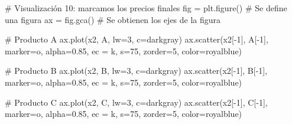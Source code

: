 \documentclass[
  letterpaper,
  DIV=11,
  numbers=noendperiod]{scrreprt}
\newenvironment{Shaded}{\begin{snugshade}}{\end{snugshade}}
\newcommand{\CommentTok}[1]{\textcolor[rgb]{0.37,0.37,0.37}{#1}}
\newcommand{\DecValTok}[1]{\textcolor[rgb]{0.68,0.00,0.00}{#1}}
\newcommand{\FloatTok}[1]{\textcolor[rgb]{0.68,0.00,0.00}{#1}}
\newcommand{\NormalTok}[1]{\textcolor[rgb]{0.00,0.23,0.31}{#1}}
\newcommand{\OperatorTok}[1]{\textcolor[rgb]{0.37,0.37,0.37}{#1}}
\newcommand{\StringTok}[1]{\textcolor[rgb]{0.13,0.47,0.30}{#1}}
\begin{document}
\begin{Shaded}
\begin{Highlighting}[]
\CommentTok{\# Visualización 10: marcamos los precios finales}
\NormalTok{fig }\OperatorTok{=}\NormalTok{ plt.figure() }\CommentTok{\# Se define una figura}
\NormalTok{ax }\OperatorTok{=}\NormalTok{ fig.gca()     }\CommentTok{\# Se obtienen los ejes de la figura}

\CommentTok{\# Producto A}
\NormalTok{ax.plot(x2, A, lw}\OperatorTok{=}\DecValTok{3}\NormalTok{, c}\OperatorTok{=}\StringTok{\textquotesingle{}darkgray\textquotesingle{}}\NormalTok{)}
\NormalTok{ax.scatter(x2[}\OperatorTok{{-}}\DecValTok{1}\NormalTok{], A[}\OperatorTok{{-}}\DecValTok{1}\NormalTok{], marker}\OperatorTok{=}\StringTok{\textquotesingle{}o\textquotesingle{}}\NormalTok{, alpha}\OperatorTok{=}\FloatTok{0.85}\NormalTok{, ec }\OperatorTok{=} \StringTok{\textquotesingle{}k\textquotesingle{}}\NormalTok{, s}\OperatorTok{=}\DecValTok{75}\NormalTok{, zorder}\OperatorTok{=}\DecValTok{5}\NormalTok{, color}\OperatorTok{=}\StringTok{\textquotesingle{}royalblue\textquotesingle{}}\NormalTok{)}

\CommentTok{\# Producto B}
\NormalTok{ax.plot(x2, B, lw}\OperatorTok{=}\DecValTok{3}\NormalTok{, c}\OperatorTok{=}\StringTok{\textquotesingle{}darkgray\textquotesingle{}}\NormalTok{)}
\NormalTok{ax.scatter(x2[}\OperatorTok{{-}}\DecValTok{1}\NormalTok{], B[}\OperatorTok{{-}}\DecValTok{1}\NormalTok{], marker}\OperatorTok{=}\StringTok{\textquotesingle{}o\textquotesingle{}}\NormalTok{, alpha}\OperatorTok{=}\FloatTok{0.85}\NormalTok{, ec }\OperatorTok{=} \StringTok{\textquotesingle{}k\textquotesingle{}}\NormalTok{, s}\OperatorTok{=}\DecValTok{75}\NormalTok{, zorder}\OperatorTok{=}\DecValTok{5}\NormalTok{, color}\OperatorTok{=}\StringTok{\textquotesingle{}royalblue\textquotesingle{}}\NormalTok{)}

\CommentTok{\# Producto C}
\NormalTok{ax.plot(x2, C, lw}\OperatorTok{=}\DecValTok{3}\NormalTok{, c}\OperatorTok{=}\StringTok{\textquotesingle{}darkgray\textquotesingle{}}\NormalTok{)}
\NormalTok{ax.scatter(x2[}\OperatorTok{{-}}\DecValTok{1}\NormalTok{], C[}\OperatorTok{{-}}\DecValTok{1}\NormalTok{], marker}\OperatorTok{=}\StringTok{\textquotesingle{}o\textquotesingle{}}\NormalTok{, alpha}\OperatorTok{=}\FloatTok{0.85}\NormalTok{, ec }\OperatorTok{=} \StringTok{\textquotesingle{}k\textquotesingle{}}\NormalTok{, s}\OperatorTok{=}\DecValTok{75}\NormalTok{, zorder}\OperatorTok{=}\DecValTok{5}\NormalTok{, color}\OperatorTok{=}\StringTok{\textquotesingle{}royalblue\textquotesingle{}}\NormalTok{)}


\end{Highlighting}
\end{Shaded}
\end{document}
